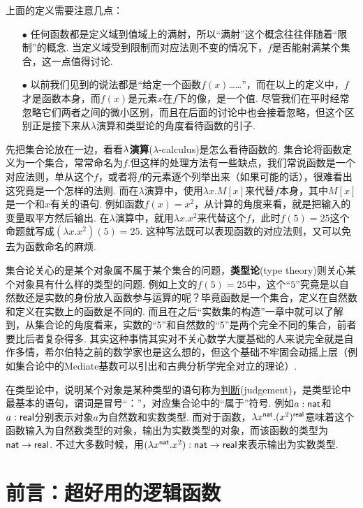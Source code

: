 \documentclass[main.tex]{subfiles}
\begin{document}
上面的定义需要注意几点：
\begin{itemize}
    \item [\(\bullet\)] 任何函数都是定义域到值域上的满射，所以“满射”这个概念往往伴随着“限制”的概念. 当定义域受到限制而对应法则不变的情况下，\(f\)是否能射满某个集合，这一点值得讨论.
    \item [\(\bullet\)] 以前我们见到的说法都是“给定一个函数\(f(x)\)……”，而在以上的定义中，\(f\)才是函数本身，而\(f(x)\)是元素\(x\)在\(f\)下的像，是一个值. 尽管我们在平时经常忽略它们两者之间的微小区别，而且在后面的讨论中也会接着忽略，但这个区别正是接下来从\(\lambda\)演算和类型论的角度看待函数的引子.
\end{itemize}

先把集合论放在一边，看看\({\rm \lambda}\)\textbf{演算}(\(\lambda\)-calculus)是怎么看待函数的. 集合论将函数定义为一个集合，常常命名为\(f\).但这样的处理方法有一些缺点，我们常说函数是一个对应法则，单从这个\(f\)，或者将\(f\)的元素逐个列举出来（如果可能的话），很难看出这究竟是一个怎样的法则. 而在\(\lambda\)演算中，使用\(\lambda x.M[x]\)来代替\(f\)本身，其中\(M[x]\)是一个和\(x\)有关的语句. 例如函数\(f(x)=x^2\)，从计算的角度来看，就是把输入的变量取平方然后输出. 在\(\lambda\)演算中，就用\(\lambda x.x^2\)来代替这个\(f\)，此时\(f(5)=25\)这个命题就写成\((\lambda x.x^2)(5)=25\). 这种写法既可以表现函数的对应法则，又可以免去为函数命名的麻烦.

集合论关心的是某个对象属不属于某个集合的问题，\textbf{类型论}(type theory)则关心某个对象具有什么样的类型的问题. 例如上文的\(f(5)=25\)中，这个“\(5\)”究竟是以自然数还是实数的身份放入函数参与运算的呢？毕竟函数是一个集合，定义在自然数和定义在实数上的函数是不同的. 而且在之后“实数集的构造”一章中就可以了解到，从集合论的角度看来，实数的“5”和自然数的“5”是两个完全不同的集合，前者要比后者复杂得多. 其实这种事情其实对不关心数学大厦基础的人来说完全就是自作多情，希尔伯特之前的数学家也是这么想的，但这个基础不牢固会动摇上层（例如集合论中的Mediate基数可以引出和古典分析学完全对立的理论）.

在类型论中，说明某个对象是某种类型的语句称为\uline{判断}(judgement)，是类型论中最基本的语句，谓词是冒号“：”，对应集合论中的“属于”符号. 例如\(a:{\sf nat}\)和\(a:{\sf real}\)分别表示对象\(a\)为自然数和实数类型. 而对于函数，\(\lambda x^{\sf nat}. (x^2)^{\sf real}\)意味着这个函数输入为自然数类型的对象，输出为实数类型的对象，而该函数的类型为\({\sf nat}\to{\sf real}\). 不过大多数时候，用\((\lambda x^{\sf nat}. x^2):{\sf nat} \to {\sf real}\)来表示输出为实数类型.

\section*{前言：超好用的逻辑函数}
\end{document}

